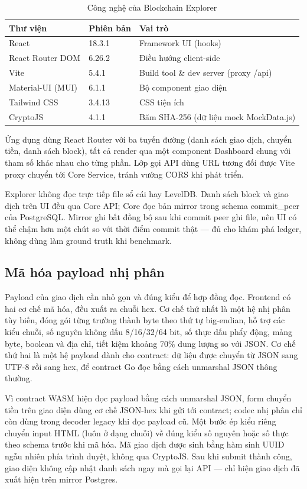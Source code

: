 \begin{table}[H]
\centering
\caption{Công nghệ của Blockchain Explorer}
\label{tab:frontend-stack}
\begin{tabular}{@{}p{3.4cm}p{2.2cm}p{5.6cm}@{}}
\toprule
Thư viện & Phiên bản & Vai trò \\
\midrule
React & 18.3.1 & Framework UI (hooks) \\
React Router DOM & 6.26.2 & Điều hướng client-side \\
Vite & 5.4.1 & Build tool \& dev server (proxy /api) \\
Material-UI (MUI) & 6.1.1 & Bộ component giao diện \\
Tailwind CSS & 3.4.13 & CSS tiện ích \\
CryptoJS & 4.1.1 & Băm SHA-256 (dữ liệu mock MockData.js) \\
\bottomrule
\end{tabular}
\end{table}

Ứng dụng dùng React Router với ba tuyến đường (danh sách giao dịch, chuyển
tiền, danh sách block), tất cả render qua một component Dashboard chung với
tham số khác nhau cho từng phần. Lớp gọi API dùng URL tương đối được Vite
proxy chuyển tới Core Service, tránh vướng CORS khi phát triển.

Explorer không đọc trực tiếp file sổ cái hay LevelDB. Danh sách block và giao
dịch trên UI đều qua Core API; Core đọc bản mirror trong schema commit\_peer
của PostgreSQL. Mirror ghi bất đồng bộ sau khi commit peer ghi file, nên UI
có thể chậm hơn một chút so với thời điểm commit thật --- đủ cho khám phá
ledger, không dùng làm ground truth khi benchmark.

\subsection{Mã hóa payload nhị phân}

Payload của giao dịch cần nhỏ gọn và đúng kiểu để hợp đồng đọc. Frontend có
hai cơ chế mã hóa, đều xuất ra chuỗi hex. Cơ chế thứ nhất là một hệ nhị phân
tùy biến, đóng gói từng trường thành byte theo thứ tự big-endian, hỗ trợ các
kiểu chuỗi, số nguyên không dấu 8/16/32/64 bit, số thực dấu phẩy động, mảng
byte, boolean và địa chỉ, tiết kiệm khoảng 70\% dung lượng so với JSON. Cơ chế
thứ hai là một hệ payload dành cho contract: dữ liệu được chuyển từ JSON sang
UTF-8 rồi sang hex, để contract Go đọc bằng cách unmarshal JSON thông thường.

Vì contract WASM hiện đọc payload bằng cách unmarshal JSON, form chuyển tiền
trên giao diện dùng cơ chế JSON-hex khi gửi tới contract; codec nhị phân chỉ
còn dùng trong decoder legacy khi đọc payload cũ. Một bước ép kiểu riêng
chuyển input HTML (luôn ở dạng chuỗi) về đúng kiểu số nguyên hoặc số thực
theo schema trước khi mã hóa. Mã giao dịch được sinh bằng hàm sinh UUID ngẫu
nhiên phía trình duyệt, không qua CryptoJS. Sau khi submit thành công, giao
diện không cập nhật danh sách ngay mà gọi lại API --- chỉ hiện giao dịch đã
xuất hiện trên mirror Postgres.

